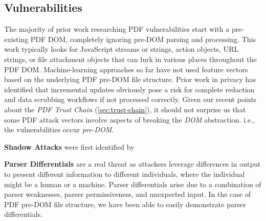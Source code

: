 
\subsection{Vulnerabilities }
\label{sec:vulnerabilities}


The majority of prior work researching PDF vulnerabilities start with a pre-existing PDF DOM,
completely ignoring pre-DOM parsing and processing. This work typically looks for
JavaScript streams or strings, action objects, URL strings, or file attachment objects that 
can lurk in various places throughout the PDF DOM. Machine-learning approaches so far have not  
used feature vectors based on the underlying PDF pre-DOM file structure. 
Prior work in privacy has identified that incremental updates obviously pose a risk for complete
redaction and data scrubbing workflows if not processed correctly.
Given our recent points about the \emph{PDF Trust Chain} (\cref{sec:trust-chain}), it should not 
surprise us that some PDF attack vectors involve aspects of breaking the \emph{DOM} abstraction.
i.e., the vulnerabilities occur \emph{pre-DOM}.

{\bf{Shadow Attacks}} were first identified by 

{\bf{Parser Differentials}} are a real threat as attackers leverage differences in output
to present different information to different individuals, where the individual might be a human
or a machine. Parser differentials arise due to a combination of parser weaknesses, 
parser permissiveness, and unexpected input. In the case of PDF pre-DOM file structure, we have been
able to easily demonstrate parser differentials.

